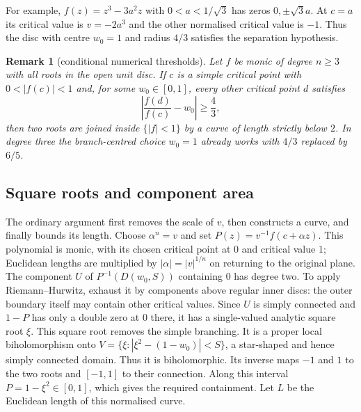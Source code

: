\documentclass[11pt]{article}
\newtheorem{remark}[theorem]{Remark}
\begin{document}
For example, $f(z)=z^3-3a^2z$ with $0<a<1/\sqrt3$ has zeros
$0,\pm\sqrt3a$. At $c=a$ its critical value is $v=-2a^3$ and the
other normalised critical value is $-1$. Thus the disc with centre
$w_0=1$ and radius $4/3$ satisfies the separation hypothesis.

\begin{remark}[conditional numerical thresholds]
\label{res:critical-value-thresholds}
Let $f$ be monic of degree $n\ge3$ with all roots in the open unit disc.  If
$c$ is a simple critical point with $0<|f(c)|<1$ and, for some
$w_0\in[0,1]$, every other critical point $d$ satisfies
\[
 \left|\frac{f(d)}{f(c)}-w_0\right|\ge\frac43,
\]
then two roots are joined inside $\{|f|<1\}$ by a curve of length strictly
below $2$.  In degree three the branch-centred choice $w_0=1$ already works
with $4/3$ replaced by $6/5$.
\end{remark}

\subsection{Square roots and component area}
The ordinary argument first removes the scale of $v$, then constructs
a curve, and finally bounds its length. Choose $\alpha^n=v$ and set
$P(z)=v^{-1}f(c+\alpha z)$. This polynomial is monic, with its chosen
critical point at $0$ and critical value $1$; Euclidean lengths are
multiplied by $|\alpha|=|v|^{1/n}$ on returning to the original plane.
The component $U$ of $P^{-1}(D(w_0,S))$ containing $0$ has degree two.
To apply Riemann--Hurwitz, exhaust it by components above regular inner
discs: the outer boundary itself may contain other critical values.
Since $U$ is simply connected and $1-P$ has only a double zero at $0$
there, it has a single-valued analytic square root $\xi$.
This square root removes the simple branching. It is a proper local
biholomorphism onto $V=\{\xi:|\xi^2-(1-w_0)|<S\}$, a star-shaped
and hence simply connected domain. Thus it is biholomorphic. Its inverse
maps $-1$ and $1$ to the two roots and $[-1,1]$ to their connection. Along this interval $P=1-\xi^2\in[0,1]$,
which gives the required containment. Let $L$ be the Euclidean length
of this normalised curve.
\end{document}
